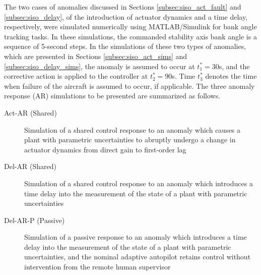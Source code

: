 The two cases of anomalies discussed in Sections \ref{subsec:siso_act_fault} and \ref{subsec:siso_delay}, of the introduction of actuator dynamics and a time delay, respectively, were simulated numerically using MATLAB/Simulink for bank angle tracking tasks. In these simulations, the commanded stability axis bank angle is a sequence of 5-second steps. In the simulations of these two types of anomalies, which are presented in Sections \ref{subsec:siso_act_sims} and \ref{subsec:siso_delay_sims}, the anomaly is assumed to occur at $t_1^* = 30$s, and the corrective action is applied to the controller at $t_2^* = 90$s. Time $t_3^*$ denotes the time when failure of the aircraft is assumed to occur, if applicable. The three anomaly response (AR) simulations to be presented are summarized as follows.
\begin{description}
	\item[Act-AR (Shared)] Simulation of a shared control response to an anomaly which causes a plant with parametric uncertainties to abruptly undergo a change in actuator dynamics from direct gain to first-order lag
	\item[Del-AR (Shared)] Simulation of a shared control response to an anomaly which introduces a time delay into the measurement of the state of a plant with parametric uncertainties
	\item[Del-AR-P (Passive)] Simulation of a passive response to an anomaly which introduces a time delay into the measurement of the state of a plant with parametric uncertainties, and the nominal adaptive autopilot retains control without intervention from the remote human supervisor
\end{description}

